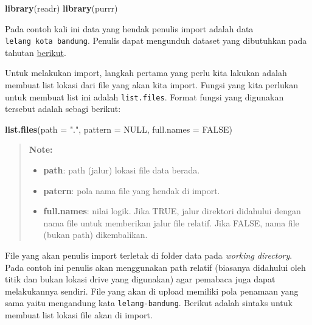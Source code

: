 \documentclass[]{book}
\newenvironment{Shaded}{\begin{snugshade}}{\end{snugshade}}
\newcommand{\KeywordTok}[1]{\textcolor[rgb]{0.13,0.29,0.53}{\textbf{#1}}}
\newcommand{\DataTypeTok}[1]{\textcolor[rgb]{0.13,0.29,0.53}{#1}}
\newcommand{\StringTok}[1]{\textcolor[rgb]{0.31,0.60,0.02}{#1}}
\newcommand{\OtherTok}[1]{\textcolor[rgb]{0.56,0.35,0.01}{#1}}
\newcommand{\NormalTok}[1]{#1}
\providecommand{\tightlist}{%
  \setlength{\itemsep}{0pt}\setlength{\parskip}{0pt}}
\begin{document}
\begin{Shaded}
\begin{Highlighting}[]
\KeywordTok{library}\NormalTok{(readr)}
\KeywordTok{library}\NormalTok{(purrr)}
\end{Highlighting}
\end{Shaded}

Pada contoh kali ini data yang hendak penulis import adalah data
\texttt{lelang\ kota\ bandung}. Penulis dapat mengunduh dataset yang
dibutuhkan pada tahutan
\href{https://github.com/mohrosidi/intro/tree/master/data-raw}{berikut}.

Untuk melakukan import, langkah pertama yang perlu kita lakukan adalah
membuat list lokasi dari file yang akan kita import. Fungsi yang kita
perlukan untuk membuat list ini adalah \texttt{list.files}. Format
fungsi yang digunakan tersebut adalah sebagi berikut:

\begin{Shaded}
\begin{Highlighting}[]
\KeywordTok{list.files}\NormalTok{(}\DataTypeTok{path =} \StringTok{"."}\NormalTok{, }\DataTypeTok{pattern =} \OtherTok{NULL}\NormalTok{, }\DataTypeTok{full.names =} \OtherTok{FALSE}\NormalTok{)}
\end{Highlighting}
\end{Shaded}

\begin{quote}
\textbf{Note: }

\begin{itemize}
\tightlist
\item
  \textbf{path}: path (jalur) lokasi file data berada.
\item
  \textbf{patern}: pola nama file yang hendak di import.
\item
  \textbf{full.names}: nilai logik. Jika TRUE, jalur direktori didahului
  dengan nama file untuk memberikan jalur file relatif. Jika FALSE, nama
  file (bukan path) dikembalikan.
\end{itemize}
\end{quote}

File yang akan penulis import terletak di folder data pada \emph{working
directory}. Pada contoh ini penulis akan menggunakan path relatif
(biasanya didahului oleh titik dan bukan lokasi drive yang digunakan)
agar pemabaca juga dapat melakukannya sendiri. File yang akan di upload
memiliki pola penamaan yang sama yaitu mengandung kata
\texttt{lelang-bandung}. Berikut adalah sintaks untuk membuat list
lokasi file akan di import.
\end{document}
